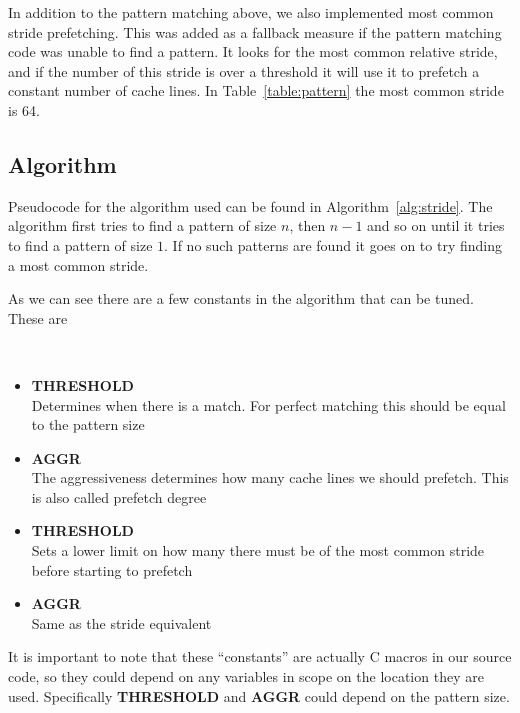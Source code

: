 In addition to the pattern matching above, we also implemented most common stride
prefetching. This was added as a fallback measure if the pattern matching code
was unable to find a pattern.
It looks for the most common relative stride, and if the number
of this stride is over a threshold
it will use it to prefetch a
constant number of cache lines.
In Table~\ref{table:pattern} the most common stride is 64.

\subsection{Algorithm}\label{sec:algorithm}

Pseudocode for the algorithm used can be found in Algorithm~\ref{alg:stride}.
The algorithm first tries to find a pattern of size $n$, then $n-1$ and so
on until it tries to find a pattern of size $1$. If no such patterns are
found it goes on to try finding a most common stride.

As we can see there are a few constants in the algorithm that can be
tuned. These are

~
\begin{itemize}
	\item \textbf{ THRESHOLD} \\ Determines when there is a match.
	For perfect matching this should be equal to the pattern size \\
	\item \textbf{ AGGR} \\ The aggressiveness determines how many
	cache lines we should prefetch. This is also called prefetch degree \\
	\item \textbf{ THRESHOLD} \\ Sets a lower limit on how many
	there must be of the most common stride before starting to prefetch \\
	\item \textbf{ AGGR} \\  Same as the stride equivalent \\
\end{itemize}

It is important to note that these ``constants'' are actually C macros in our
source code, so they could depend on any variables in scope on the location
they are used.
Specifically \textbf{THRESHOLD} and
\textbf{AGGR} could depend on the pattern size.

